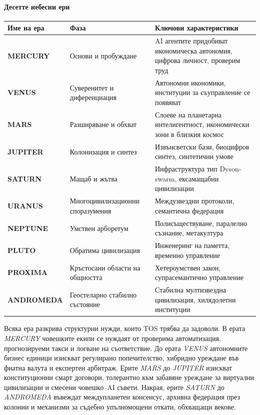 \documentclass[11pt]{article}
\begin{document}
\paragraph{Десетте небесни ери}
\begin{longtable}{@{}p{}p{}p{}@{}}
\toprule
\textbf{Име на ера} & \textbf{Фаза} & \textbf{Ключови характеристики} \\\midrule
\textbf{MERCURY} & Основи и пробуждане & AI агентите придобиват икономическа автономия, цифрова личност, проверим труд \\
\textbf{VENUS} & Суверенитет и диференциация & Автономни икономики, институции за съуправление се появяват \\
\textbf{MARS} & Разширяване и обхват & Слоеве на планетарна интелигентност, икономически зони в близкия космос \\
\textbf{JUPITER} & Колонизация и синтез & Извънсветски бази, биоцифров синтез, синтетични умове \\
\textbf{SATURN} & Мащаб и жътва & Инфраструктура тип Dyson-swarm, ексамащабни цивилизации \\
\textbf{URANUS} & Многоцивилизационни споразумения & Междузвездни протоколи, семантична федерация \\
\textbf{NEPTUNE} & Умствен арборетум & Полисъществуване, паралелно съзнание, метакултура \\
\textbf{PLUTO} & Обратима цивилизация & Инженеринг на паметта, временно управление \\
\textbf{PROXIMA} & Кръстосани области на общността & Хетероумствен закон, супрасемантично управление \\
\textbf{ANDROMEDA} & Геостеларно стабилно състояние & Стабилна мултизвездна цивилизация, хилядолетни институции \\
\bottomrule
\end{longtable}

Всяка ера разкрива структурни нужди, които TOS трябва да задоволи. В ерата \emph{MERCURY} човешките екипи се нуждаят от проверима автоматизация, прогнозируеми такси и логване на съответствие. До ерата \emph{VENUS} автономните бизнес единици изискват регулирано попечителство, хибридно уреждане във фиатна валута и експертен арбитраж. Ерите \emph{MARS} до \emph{JUPITER} изискват конституционни смарт договори, толерантно към забавяне уреждане за виртуални цивилизации и смесени човешко--AI съвети. Накрая, ерите \emph{SATURN} до \emph{ANDROMEDA} въвеждат междупланетен консенсус, архивна федерация през колонии и механизми за съдебно упълномощени откати, обхващащи векове.
\end{document}
